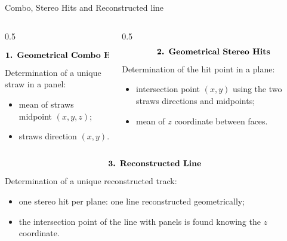 \documentclass{beamer}[10pt]
\begin{document}
  \begin{frame}{Combo, Stereo Hits and Reconstructed line}
    \vspace{-3mm}
\begin{columns}
  \begin{column}{0.5\framewidth}
    \vspace{-20mm}

    $$\textbf{\text{1. Geometrical Combo Hits}}$$
    Determination of a unique straw in a panel:
    \begin{itemize}
      \item mean of straws midpoint $(x,y,z)$;
      \item straws direction $(x,y)$.
    \end{itemize}
  \end{column}
  \begin{column}{0.5\framewidth}
    $$\textbf{\text{2. Geometrical Stereo Hits}}$$
    Determination of the hit point in a plane:
    \begin{itemize}
      \item intersection point $(x,y)$ using the two straws directions and midpoints;
      \item mean of $z$ coordinate between faces.
    \end{itemize}
  \end{column}
\end{columns}
\vspace{5mm}

$$\textbf{\text{3. Reconstructed Line}}$$
Determination of a unique reconstructed track:
\begin{itemize}
  \item one stereo hit per plane: one line reconstructed geometrically;
  \item the intersection point of the line with panels is found knowing the $z$ coordinate. 
\end{itemize}

  \end{frame}
\end{document}

